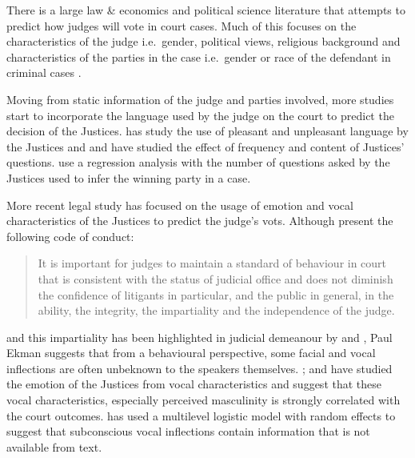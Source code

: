 \documentclass{monashthesis}
\begin{document}
There is a large law \& economics and political science literature that attempts to predict how judges will vote in court cases. Much of this focuses on the characteristics of the judge i.e.~gender, political views, religious background and characteristics of the parties in the case i.e.~gender or race of the defendant in criminal cases \autocites{Stuart1962}{Peter1984}{Combining1987}{Susan1988}{Steffensmeier2001}{Kulik2003}.

Moving from static information of the judge and parties involved, more studies start to incorporate the language used by the judge on the court to predict the decision of the Justices. \textcite{black2011emotions} has study the use of pleasant and unpleasant language by the Justices and \textcite{Shullman2004illusion} and \textcite{johnson2009inquiring} have studied the effect of frequency and content of Justices' questions. \textcite{epstein2010inferring} use a regression analysis with the number of questions asked by the Justices used to infer the winning party in a case.

More recent legal study has focused on the usage of emotion and vocal characteristics of the Justices to predict the judge's vots. Although \textcite{judicalguid} present the following code of conduct:

\begin{quote}
It is important for judges to maintain a standard of behaviour in court that is consistent with the status of judicial office and does not diminish the confidence of litigants in particular, and the public in general, in the ability, the integrity, the impartiality and the independence of the judge.
\end{quote}

and this impartiality has been highlighted in judicial demeanour by \textcite{tutton2018judicial} and \textcite{goffman1956nature}, Paul Ekman \textcite{ekman1991invited} suggests that from a behavioural perspective, some facial and vocal inflections are often unbeknown to the speakers themselves. \textcite{chen2016perceived}; \textcite{chen2017covering} and \textcite{schubert1992observing} have studied the emotion of the Justices from vocal characteristics and suggest that these vocal characteristics, especially perceived masculinity is strongly correlated with the court outcomes. \textcite{dietrich2019emotional} has used a multilevel logistic model with random effects to suggest that subconscious vocal inflections contain information that is not available from text.
\end{document}
